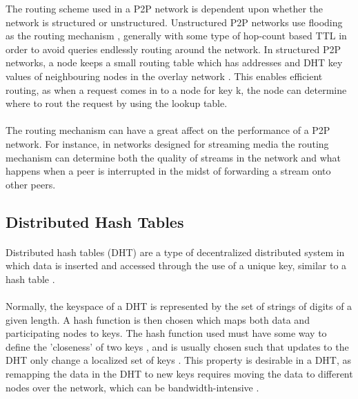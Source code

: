 \documentclass[12pt,letterpaper]{article}
\begin{document}
The routing scheme used in a P2P network is dependent upon whether the network is structured or unstructured.
Unstructured P2P networks use flooding as the routing mechanism \cite{overlay}, generally with some type of hop-count based TTL in order to avoid queries endlessly routing around the network.
In structured P2P networks, a node keeps a small routing table which has addresses and DHT key values of neighbouring nodes in the overlay network \cite{overlay}.
This enables efficient routing, as when a request comes in to a node for key k, the node can determine where to rout the request by using the lookup table.

\paragraph{}

The routing mechanism can have a great affect on the performance of a P2P network.
For instance, in networks designed for streaming media \cite{streaming} the routing mechanism can determine both the quality of streams in the network and what happens when a peer is interrupted in the midst of forwarding a stream onto other peers.

\subsection{Distributed Hash Tables}
\label{DHT}

\paragraph{}

Distributed hash tables (DHT) are a type of decentralized distributed system in which data is inserted and accessed through the use of a unique key, similar to a hash table \cite{dht}\cite{wiki-dht}.

\paragraph{}

Normally, the keyspace of a DHT is represented by the set of strings of digits of a given length.
A hash function is then chosen which maps both data and participating nodes to keys.
The hash function used must have some way to define the 'closeness' of two keys \cite{dht}, and is usually chosen such that updates to the DHT only change a localized set of keys \cite{wiki-dht}.
This property is desirable in a DHT, as remapping the data in the DHT to new keys requires moving the data to different nodes over the network, which can be bandwidth-intensive \cite{wiki-dht}.
\end{document}
